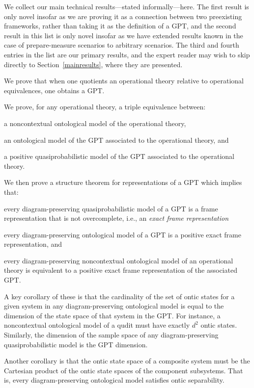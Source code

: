 \documentclass[onecolum,aps,groupedaddress,nofootinbib]{revtex4-2}
\begin{document}
We collect our main technical results---stated informally---here.
The first result is only novel insofar as we are proving it as a connection between two preexisting frameworks, rather than taking it as the definition of a GPT, and
 the second result in this list is only novel insofar as we have extended results known in the case of prepare-measure scenarios to arbitrary scenarios. The third and fourth entries in the list are our primary results, and the expert reader may wish to skip directly to Section~\ref{mainresults}, where they are presented.

\ben
\item We prove that when one quotients an operational theory relative to operational equivalences, one obtains a GPT.
\item We prove, for any operational theory, a triple equivalence between:
\bit
\item a noncontextual ontological model of the operational theory,
 \item an ontological model of the GPT associated to the operational theory, and
\item a positive quasiprobabilistic model of the GPT associated to the operational theory.
\eit
\item We then prove a structure theorem for representations of a GPT which implies that:
\ben
\item every diagram-preserving quasiprobabilistic model of a GPT is a frame representation that is not overcomplete, i.e., an {\em exact frame representation}
\item every diagram-preserving ontological model of a GPT is a positive exact frame representation, and
\item every diagram-preserving noncontextual ontological model of an operational theory is equivalent to a positive exact frame representation of the associated GPT.
\een
\item A key corollary of these is that the cardinality of the set of ontic states for a given system in
any diagram-preserving ontological model is equal to the dimension of the state space of that system in
the GPT. For instance, a noncontextual ontological model of a qudit must have exactly $d^2$ ontic states. Similarly, the dimension of the sample space of any diagram-preserving quasiprobabilistic model is the GPT dimension.
\item Another corollary is that the ontic state space of a composite system must be the Cartesian product of the ontic state spaces of the component subsystems. That is, every diagram-preserving ontological model satisfies ontic separability.
\een
\end{document}
